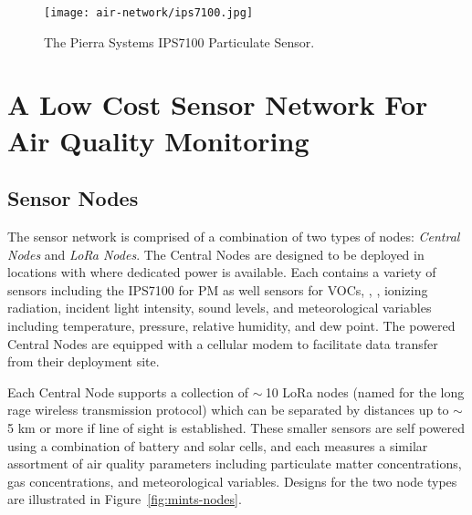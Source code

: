 \begin{figure}[!h]
  \vspace{-1cm}
  \centering
  \texttt{[image: air-network/ips7100.jpg]}
  \caption{The Pierra Systems IPS7100 Particulate Sensor.}
  \label{fig:ips7100}
\end{figure}

\section{A Low Cost Sensor Network For Air Quality Monitoring}



\subsection{Sensor Nodes}

The sensor network is comprised of a combination of two types of nodes:
\textit{Central Nodes} and \textit{LoRa Nodes}. The Central Nodes are designed
to be deployed in locations with where dedicated power is available. Each
contains a variety of sensors including the IPS7100 for PM as well sensors for
VOCs, , , ionizing radiation, incident light intensity,
sound levels, and meteorological variables including temperature,
pressure, relative humidity, and dew point. The powered Central Nodes are
equipped with a cellular modem to facilitate data transfer from their deployment
site.


Each Central Node supports a collection of $\sim~$10 LoRa nodes (named for the
long rage wireless transmission protocol) which can be separated by distances up
to $\sim$5 km or more if line of sight is established. These smaller sensors are self
powered using a combination of battery and solar cells, and each measures a
similar assortment of air quality parameters including particulate matter
concentrations, gas concentrations, and meteorological variables. Designs for
the two node types are illustrated in Figure~\ref{fig:mints-nodes}.

